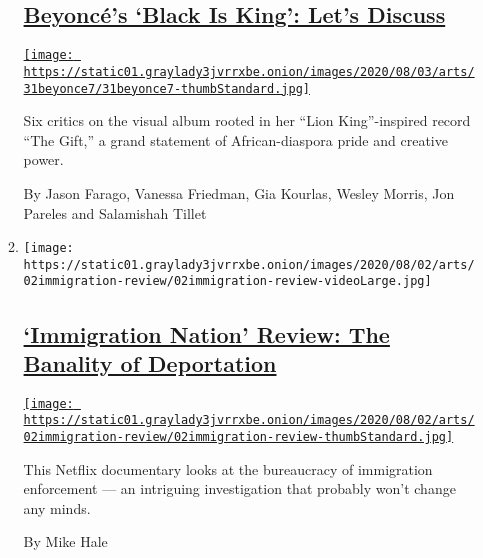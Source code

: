 \begin{enumerate}
\begin{enumerate}
    \hypertarget{beyoncuxe9s-black-is-king-lets-discuss}{%
    \subsection{\texorpdfstring{\href{/2020/07/31/arts/music/beyonce-black-is-king.html}{Beyoncé's
    `Black Is King': Let's
    Discuss}}{Beyoncé's `Black Is King': Let's Discuss}}\label{beyoncuxe9s-black-is-king-lets-discuss}}

    \href{/2020/07/31/arts/music/beyonce-black-is-king.html}{\texttt{[image: https://static01.graylady3jvrrxbe.onion/images/2020/08/03/arts/31beyonce7/31beyonce7-thumbStandard.jpg]}}

    Six critics on the visual album rooted in her ``Lion King''-inspired
    record ``The Gift,'' a grand statement of African-diaspora pride and
    creative power.

    By Jason Farago, Vanessa Friedman, Gia Kourlas, Wesley Morris, Jon
    Pareles and Salamishah Tillet
  \item
    \texttt{[image: https://static01.graylady3jvrrxbe.onion/images/2020/08/02/arts/02immigration-review/02immigration-review-videoLarge.jpg]}

    \hypertarget{immigration-nation-review-the-banality-of-deportation}{%
    \subsection{\texorpdfstring{\href{/2020/08/02/arts/television/immigration-nation-review-netflix.html}{`Immigration
    Nation' Review: The Banality of
    Deportation}}{`Immigration Nation' Review: The Banality of Deportation}}\label{immigration-nation-review-the-banality-of-deportation}}

    \href{/2020/08/02/arts/television/immigration-nation-review-netflix.html}{\texttt{[image: https://static01.graylady3jvrrxbe.onion/images/2020/08/02/arts/02immigration-review/02immigration-review-thumbStandard.jpg]}}

    This Netflix documentary looks at the bureaucracy of immigration
    enforcement --- an intriguing investigation that probably won't
    change any minds.

    By Mike Hale
  \end{enumerate}
\end{enumerate}

